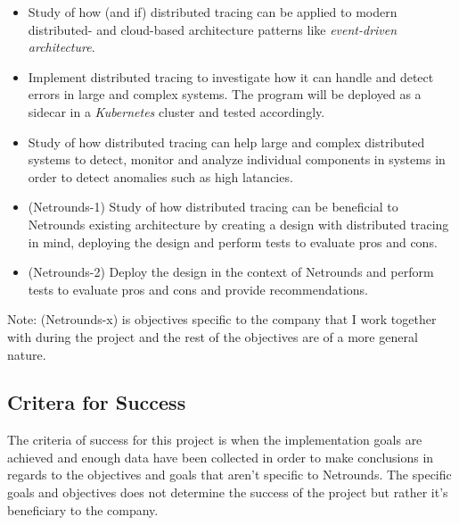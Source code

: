 \documentclass[10pt, titlepage, oneside, a4paper]{article}
\begin{document}
\begin{itemize}
    \item Study of how (and if) distributed tracing can be applied to modern distributed- and cloud-based architecture patterns like \textit{event-driven architecture}.
	\item Implement distributed tracing to investigate how it can handle and detect errors in large and complex systems. The program will be deployed as a sidecar in a \textit{Kubernetes} cluster and tested accordingly.
	\item Study of how distributed tracing can help large and complex distributed systems to detect, monitor and analyze individual components in systems in order to detect anomalies such as high latancies. 
	\item (Netrounds-1) Study of how distributed tracing can be beneficial to Netrounds existing architecture by creating a design with distributed tracing in mind, deploying the design and perform tests to evaluate pros and cons.
	\item (Netrounds-2) Deploy the design in the context of Netrounds and perform tests to evaluate pros and cons and provide recommendations. 
\end{itemize}

Note: (Netrounds-x) is objectives specific to the company that I work together with during the project and the rest of the objectives are of a more general nature.



\subsection{Critera for Success}

The criteria of success for this project is when the implementation goals are achieved and enough data have been collected in order to make conclusions in regards to the objectives and goals that aren't specific to Netrounds. The specific goals and objectives does not determine the success of the project but rather it's beneficiary to the company.



\end{document}
